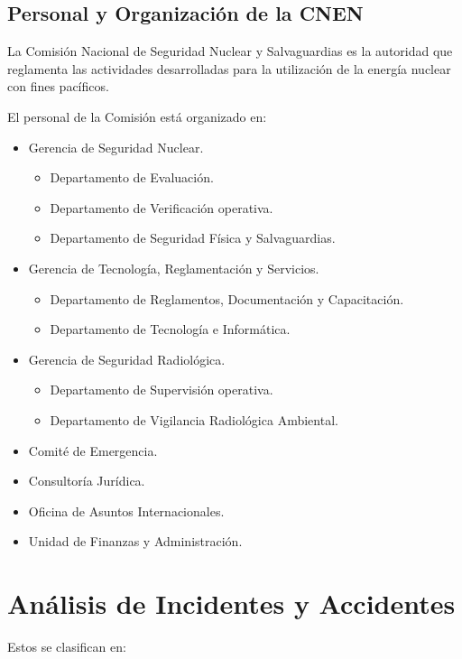 \section*{Personal y Organización de la CNEN}

La Comisión Nacional de Seguridad Nuclear y Salvaguardias es la autoridad que reglamenta las actividades desarrolladas para la utilización de la energía nuclear con fines pacíficos.

El personal de la Comisión está organizado en:

\begin{itemize}
    \item Gerencia de Seguridad Nuclear.
    \begin{itemize}
        \item Departamento de Evaluación.
        \item Departamento de Verificación operativa.
        \item Departamento de Seguridad Física y Salvaguardias.
    \end{itemize}
    \item Gerencia de Tecnología, Reglamentación y Servicios.
    \begin{itemize}
        \item Departamento de Reglamentos, Documentación y Capacitación.
        \item Departamento de Tecnología e Informática.
    \end{itemize}
    \item Gerencia de Seguridad Radiológica.
    \begin{itemize}
        \item Departamento de Supervisión operativa.
        \item Departamento de Vigilancia Radiológica Ambiental.
    \end{itemize}
    \item Comité de Emergencia.
    \item Consultoría Jurídica.
    \item Oficina de Asuntos Internacionales.
    \item Unidad de Finanzas y Administración.
\end{itemize}

\chapter{Análisis de Incidentes y Accidentes}

Estos se clasifican en:

